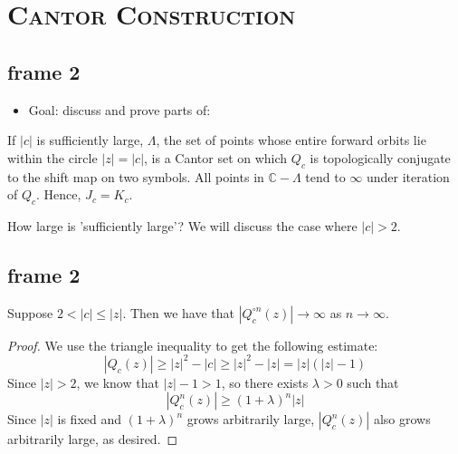 \documentclass[xcolor=x11names,compress]{beamer}
\renewcommand{\(}{\begin{columns}}
\renewcommand{\)}{\end{columns}}
\newcommand{\<}[1]{\begin{column}{#1}}
\renewcommand{\>}{\end{column}}
\begin{document}
\section{\scshape Cantor Construction}


\subsection{frame 2}
\begin{frame}

\begin{itemize}
\item Goal: discuss and prove parts of:
\end{itemize}

\vspace{.7cm}




\begin{theorem}
If $|c|$ is sufficiently large, $\Lambda$, the set of points whose entire forward orbits lie within the circle $|z|=|c|$, is a Cantor set on which $Q_c$ is topologically conjugate to the shift map on two symbols. All points in $\mathbb{C} - \Lambda$ tend to $\infty$ under iteration of $Q_c$. Hence, $J_c=K_c$.
\end{theorem}

\vspace{.7cm}

How large is 'sufficiently large'? We will discuss the case where $|c| > 2$.

\end{frame}


\subsection{frame 2}
\begin{frame}

\begin{theorem} 
Suppose $2 < |c| \le |z|$. Then we have that $|Q_c^{\circ n}(z)| \rightarrow \infty$ as $n \rightarrow \infty$.
\end{theorem}

\pause

\begin{proof}
We use the triangle inequality to get the following estimate:
\begin{equation}
    |Q_c(z)| \geq |z|^2 - |c| \geq |z|^2 - |z| = |z|(|z|-1)
\end{equation}
Since $|z| > 2$, we know that $|z|-1>1$, so there exists $\lambda > 0$ such that 
\begin{equation}
    |Q_c^n(z)| \geq (1+\lambda)^n|z|
\end{equation}
Since $|z|$ is fixed and $(1+\lambda)^n$ grows arbitrarily large, $|Q_c^n(z)|$ also grows arbitrarily large, as desired.
\end{proof}

\end{frame}
\end{document}
